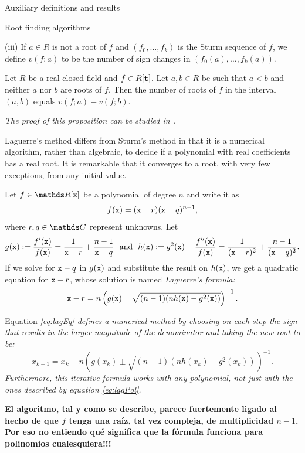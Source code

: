 \documentclass[11pt, a4paper, english, twoside, notitlepage, openright]{report}
\begin{document}
\begin{chapter}{Auxiliary definitions and results}
\begin{section}{Root finding algorithms}
\begin{definitions}
(iii) If $a\in R$ is not a root of $f$ and $(f_0,\dots,f_k)$ is the Sturm sequence of $f$, we define $v(f;a)$ to be the number of sign changes in $(f_0(a),\dots,f_k(a))$.
\end{definitions}
\begin{proposition}\label{sturm} 
Let $R$ be a real closed field and $f\in R[{\tt t}]$. Let $a,b\in R$ be such that $a<b$ and neither $a$ nor $b$ are roots of $f$. Then the number of roots of $f$ in the interval $(a,b)$ equals $v(f;a)-v(f;b)$.

\em The proof of this proposition can be studied in \cite[1.2.10]{bcr}. \em
\end{proposition}

Laguerre's method differs from Sturm's method in that it is a numerical algorithm, rather than algebraic, to decide if a polynomial with real coefficients has a real root. It is remarkable that it converges to a root, with very few exceptions, from any initial value.

\begin{proposition}\label{laguerre}
Let $f\in\R[{\tt x}]$ be a polynomial of degree $n$ and write it as
\begin{equation}\label{eq:lagPol}
f({\tt x})=({\tt x}-r)({\tt x}-q)^{n-1},
\end{equation}
where $r,q\in\C$ represent unknowns. Let 
$$
g({\tt x}):=\frac{f'({\tt x})}{f({\tt x})}=\frac{1}{{\tt x}-r}+\frac{n-1}{{\tt x}-q} \ \text{ and } \ h({\tt x}):=g^2({\tt x})-\frac{f''({\tt x})}{f({\tt x})}=\frac{1}{({\tt x}-r)^2}+\frac{n-1}{({\tt x}-q)^2}.
$$
If we solve for ${\tt x}-q$ in $g({\tt x})$ and substitute the result on $h({\tt x})$, we get a quadratic equation for ${\tt x}-r$, whose solution is named \em Laguerre's formula\em:
\begin{equation}\label{eq:lagEq}
{\tt x}-r=n\left(g({\tt x})\pm\sqrt{(n-1)(nh({\tt x})-g^2({\tt x}))}\right)^{-1}.
\end{equation}

Equation \em \ref{eq:lagEq} \em defines a numerical method by choosing on each step the sign that results in the larger magnitude of the denominator and taking the new root to be:
$$
x_{k+1}=x_k-n\left(g(x_k)\pm\sqrt{ (n-1)(nh(x_k)-g^2(x_k))}\right)^{-1}.
$$
Furthermore, this iterative formula works with any polynomial, not just with the ones described by equation \em \ref{eq:lagPol}. \em 
\end{proposition}

{\bf El algoritmo, tal y como se describe, parece fuertemente ligado al hecho de que $f$ tenga una ra\'iz, tal vez compleja, de multiplicidad $n-1$. Por eso no entiendo qu\'e significa que la f\'ormula funciona para polinomios cualesquiera!!!}


\end{section}
\end{chapter}
\end{document}
